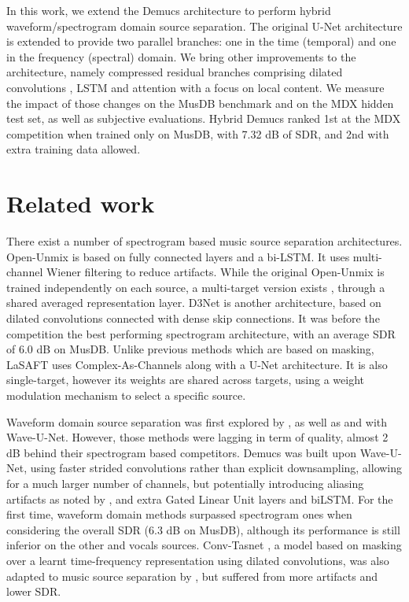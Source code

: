\documentclass[10pt,a4paper,onecolumn]{article}
\begin{document}
In this work, we extend the Demucs architecture to perform hybrid
waveform/spectrogram domain source separation. The original U-Net
architecture \citep{unet} is extended to provide two parallel branches:
one in the time (temporal) and one in the frequency (spectral) domain.
We bring other improvements to the architecture, namely compressed
residual branches comprising dilated convolutions \citep{dilated}, LSTM
\citep{lstm} and attention \citep{attention} with a focus on local
content. We measure the impact of those changes on the MusDB benchmark
and on the MDX hidden test set, as well as subjective evaluations.
Hybrid Demucs ranked 1st at the MDX competition when trained only on
MusDB, with 7.32 dB of SDR, and 2nd with extra training data allowed.

\hypertarget{related-work}{%
\section{Related work}\label{related-work}}

There exist a number of spectrogram based music source separation
architectures. Open-Unmix \citep{umx} is based on fully connected layers
and a bi-LSTM. It uses multi-channel Wiener filtering \citep{wiener} to
reduce artifacts. While the original Open-Unmix is trained independently
on each source, a multi-target version exists \citep{xumx}, through a
shared averaged representation layer. D3Net \citep{d3net} is another
architecture, based on dilated convolutions connected with dense skip
connections. It was before the competition the best performing
spectrogram architecture, with an average SDR of 6.0 dB on MusDB. Unlike
previous methods which are based on masking, LaSAFT \citep{lasaft} uses
Complex-As-Channels \citep{cac} along with a U-Net \citep{unet}
architecture. It is also single-target, however its weights are shared
across targets, using a weight modulation mechanism to select a specific
source.

Waveform domain source separation was first explored by \citet{wavenet},
as well as \citet{waveunet_singing} and \citet{waveunet} with
Wave-U-Net. However, those methods were lagging in term of quality,
almost 2 dB behind their spectrogram based competitors. Demucs
\citep{demucs} was built upon Wave-U-Net, using faster strided
convolutions rather than explicit downsampling, allowing for a much
larger number of channels, but potentially introducing aliasing
artifacts as noted by \citet{pons2021upsampling}, and extra Gated Linear Unit layers
\citep{glu} and biLSTM. For the first time, waveform domain methods
surpassed spectrogram ones when considering the overall SDR (6.3 dB on
MusDB), although its performance is still inferior on the other and
vocals sources. Conv-Tasnet \citep{convtasnet}, a model based on masking
over a learnt time-frequency representation using dilated convolutions,
was also adapted to music source separation by \citet{demucs}, but
suffered from more artifacts and lower SDR.
\end{document}
